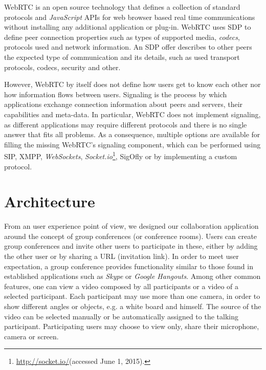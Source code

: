 \documentclass[10pt,conference]{IEEEtran}
\begin{document}
\gls{WebRTC} is an open source technology that defines a collection of standard protocols and \emph{JavaScript} \gls{API}s for web browser based real time communications without installing any additional application or plug-in. 
\gls{WebRTC} uses \gls{SDP} \cite{rfc4566} to define peer connection properties such as types of supported media, \emph{codecs}, protocols used and network information. An \gls{SDP} offer describes to other peers the expected type of communication and its details, such as used transport protocols, codecs, security and other.



However, \gls{WebRTC} by itself does not define how users get to know each other nor how information flows between users. 
  Signaling is the process by which applications exchange connection information about peers and servers, their capabilities and meta-data.
  In particular, \gls{WebRTC} does not implement signaling, as different applications may require different protocols and there is no single answer that fits all problems.
  As a consequence, multiple options are available for filling the missing \gls{WebRTC}'s signaling component, which can be performed using \gls{SIP}\cite{rfc3261}, \gls{XMPP}, \emph{WebSockets}, \emph{Socket.io}\footnote{\url{http://socket.io/}(accessed June 1, 2015).}, \gls{SigOfly}\cite{sigofly} or by implementing a custom protocol.

 	











\section{Architecture}
\label{chapter:architecture}

From an user experience point of view, we designed our collaboration application around the concept of group conferences (or conference rooms).
Users can create group conferences and invite other users to participate in these, either by adding the other user or by sharing a \gls{URL} (invitation link).
In order to meet user expectation, a group conference provides functionality similar to those found in established applications such as \emph{Skype} or \emph{Google Hangouts}.
Among other common features, one can view a video composed by all participants or a video of a selected participant.
Each participant may use more than one camera, in order to show different angles or objects, e.g. a white board and himself.
The source of the video can be selected manually or be automatically assigned to the talking participant.
Participating users may choose to view only, share their microphone, camera or screen.
\end{document}

